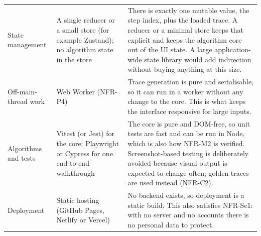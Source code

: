 \documentclass[11pt,a4paper]{article}
\begin{document}
{\begin{longtable}{@{}L{3.1cm}L{2.9cm}L{8.6cm}@{}}
State management & A single reducer or a small store (for example Zustand); no algorithm
state in the store &
There is exactly one mutable value, the step index, plus the loaded trace. A reducer or a
minimal store keeps that explicit and keeps the algorithm core out of the UI state. A large
application-wide state library would add indirection without buying anything at this size. \\

Off-main-thread work & Web Worker (NFR-P4) &
Trace generation is pure and serialisable, so it can run in a worker without any change to
the core. This is what keeps the interface responsive for large inputs. \\

Algorithms and tests & Vitest (or Jest) for the core; Playwright or Cypress for one
end-to-end walkthrough &
The core is pure and DOM-free, so unit tests are fast and can be run in Node, which is also
how NFR-M2 is verified. Screenshot-based testing is deliberately avoided because visual
output is expected to change often; golden traces are used instead (NFR-C2). \\

Deployment & Static hosting (GitHub Pages, Netlify or Vercel) &
No backend exists, so deployment is a static build. This also satisfies NFR-Se1: with no
server and no accounts there is no personal data to protect. \\
\end{longtable}
}
\end{document}
